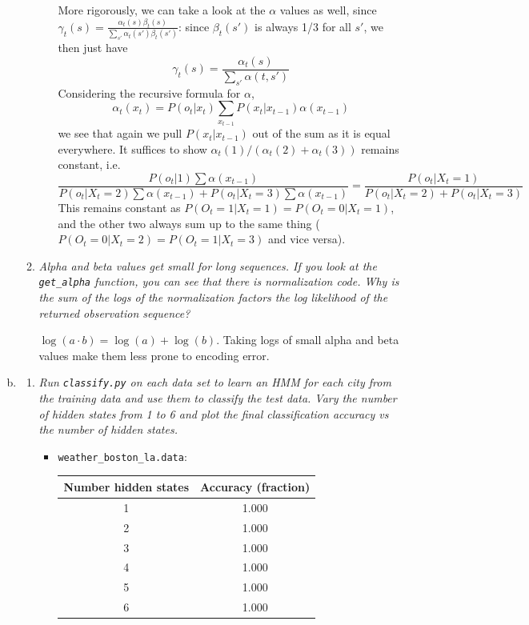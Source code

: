 \documentclass{article}
\begin{document}
\begin{enumerate}[(a)]
\begin{enumerate}
\begin{enumerate}[(1)]
    More rigorously, we can take a look at the $\alpha$ values as well, 
    since $\gamma_t(s)=\frac{\alpha_t(s)\beta_t(s)}{\sum_{s'}\alpha_t(s')\beta_t(s')}$:
    since $\beta_t(s')$ is always 1/3 for all $s'$, we then just have
    $$\gamma_t(s)=\frac{\alpha_t(s)}{\sum_{s'}\alpha(t,s')}$$
    Considering the recursive formula for $\alpha$, 
    $$\alpha_t(x_t)=P(o_t|x_t)\sum_{x_{t-1}}P(x_t|x_{t-1})\alpha(x_{t-1})$$ we
    see that again we pull $P(x_t|x_{t-1})$ out of the sum as it is
    equal everywhere. It suffices to show $\alpha_t(1)/(\alpha_t(2)+\alpha_t(3))$
    remains constant, i.e. 
    $$\frac{P(o_t|1)\sum \alpha(x_{t-1})}{P(o_t|X_t=2)\sum\alpha(x_{t-1})+P(o_t|X_t=3)\sum \alpha(x_{t-1})}=\frac{P(o_t|X_t=1)}{P(o_t|X_t=2)+P(o_t|X_t=3)}$$
    This remains constant as $P(O_t=1|X_t=1)=P(O_t=0|X_t=1)$, and the other two 
    always sum up to the same thing ($P(O_t=0|X_t=2)=P(O_t=1|X_t=3)$ and vice versa). 

    \end{enumerate}

  \item \emph{Alpha and beta values get small for long sequences. If you look at the
    \emph{\texttt{get\_alpha}} function, you can see that there is normalization code.
    Why is the sum of the logs of the normalization factors the log likelihood of
    the returned observation sequence?}

    $\log(a\cdot b)=\log(a)+\log(b)$. Taking logs of small alpha and beta values
    make them less prone to encoding error.

  \end{enumerate}

\item
  \begin{enumerate}
  \item \emph{Run \texttt{\emph{classify.py}} on each data set to learn an HMM
    for each city from the training data and use them to classify the test data.
    Vary the number of hidden states from 1 to 6 and plot the final classification
    accuracy vs the number of hidden states.}

    \begin{itemize}
    \item \texttt{weather\_boston\_la.data}:\\ 

    \begin{tabular}{|cc|}
    \hline
    Number hidden states & Accuracy (fraction)\\
    \hline
    1 & 1.000\\
    2 & 1.000\\
    3 & 1.000\\
    4 & 1.000\\
    5 & 1.000\\
    6 & 1.000\\
    \hline
    \end{tabular}


\end{itemize}
\end{enumerate}
\end{enumerate}
\end{document}
